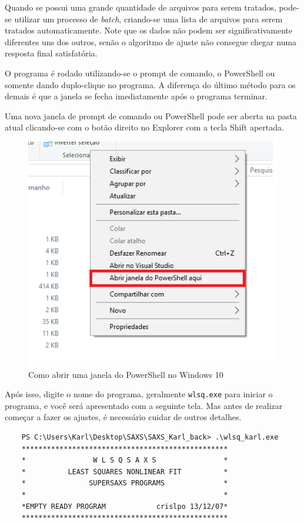 \begin{apendicesenv}
Quando se possui uma grande quantidade de arquivos para serem tratados, pode-se utilizar um processo de \emph{batch}, criando-se uma lista de arquivos para serem tratados automaticamente. Note que os dados não podem ser significativamente diferentes uns dos outros, senão o algoritmo de ajuste não consegue chegar numa resposta final satisfatória.

O programa é rodado utilizando-se o prompt de comando, o PowerShell ou somente dando duplo-clique no programa. A diferença do último método para os demais é que a janela se fecha imediatamente após o programa terminar.

Uma nova janela de prompt de comando ou PowerShell pode ser aberta na pasta atual clicando-se com o botão direito no Explorer com a tecla Shift apertada.

\begin{figure}[t]
	\includegraphics[scale=0.5]{./imagens/saxs/supersaxs_Powershell}
	\centering
	\caption{Como abrir uma janela do PowerShell no Windows 10}
	\centering
\end{figure}

Após isso, digite o nome do programa, geralmente \texttt{wlsq.exe} para iniciar o programa, e você será apresentado com a seguinte tela. Mas antes de realizar começar a fazer os ajustes, é necessário cuidar de outros detalhes.
\begin{samepage}
	\begin{verbatim}
	PS C:\Users\Karl\Desktop\SAXS\SAXS_Karl_back> .\wlsq_karl.exe
	*************************************************
	*                W L S Q S A X S                *
	*          LEAST SQUARES NONLINEAR FIT          *
	*               SUPERSAXS PROGRAMS              *
	*                                               *
	*EMPTY READY PROGRAM            crislpo 13/12/07*
	*************************************************
	

\end{verbatim}
\end{samepage}
\end{apendicesenv}

